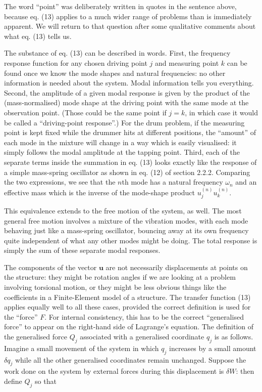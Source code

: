   The word ``point'' was deliberately written in quotes in the sentence above, 
  because eq. (13) applies to a much wider range of problems than is 
  immediately apparent. We will return to that question after some qualitative 
  comments about what eq. (13) tells us. 

  The substance of eq. (13) can be described in words. First, the frequency 
  response function for any chosen driving point $j$ and measuring point $k$ 
  can be found once we know the mode shapes and natural frequencies: no other 
  information is needed about the system. Modal information tells you 
  everything. Second, the amplitude of a given modal response is given by the 
  product of the (mass-normalised) mode shape at the driving point with the 
  same mode at the observation point. (Those could be the same point if $j = 
  k$, in which case it would be called a ``driving-point response''.) For the 
  drum problem, if the measuring point is kept fixed while the drummer hits at 
  different positions, the ``amount'' of each mode in the mixture will change 
  in a way which is easily visualised: it simply follows the modal amplitude at 
  the tapping point. Third, each of the separate terms inside the summation in 
  eq. (13) looks exactly like the response of a simple mass-spring oscillator 
  as shown in eq. (12) of section 2.2.2. Comparing the two expressions, we see 
  that the $n$th mode has a natural frequency $\omega_n$ and an effective mass 
  which is the inverse of the mode-shape product $u_j^{(n)}u_k^{(n)}$. 

  This equivalence extends to the free motion of the system, as well. The most 
  general free motion involves a mixture of the vibration modes, with each mode 
  behaving just like a mass-spring oscillator, bouncing away at its own 
  frequency quite independent of what any other modes might be doing. The total 
  response is simply the sum of these separate modal responses. 

  The components of the vector $\mathbf{u}$ are not necessarily displacements 
  at points on the structure: they might be rotation angles if we are looking 
  at a problem involving torsional motion, or they might be less obvious things 
  like the coefficients in a Finite-Element model of a structure. The transfer 
  function (13) applies equally well to all these cases, provided the correct 
  definition is used for the ``force'' $F$. For internal consistency, this has 
  to be the correct ``generalised force'' to appear on the right-hand side of 
  Lagrange's equation. The definition of the generalised force $Q_j$ associated 
  with a generalised coordinate $q_j$ is as follows. Imagine a small movement 
  of the system in which $q_j$ increases by a small amount $\delta q_j$ while 
  all the other generalised coordinates remain unchanged. Suppose the work done 
  on the system by external forces during this displacement is $\delta W$: then 
  define $Q_j$ so that 

